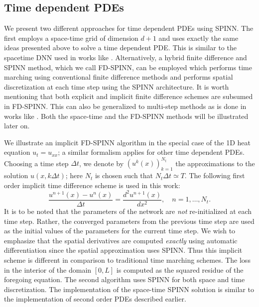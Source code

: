 \documentclass[12pt]{article}
\newcommand{\rr}[1]{#1}
\newcommand{\rb}[1]{#1}
\begin{document}
\subsection{Time dependent PDEs}
We present two different approaches for time dependent PDEs using SPINN. The first employs a space-time grid of dimension $d + 1$ and uses exactly the same ideas presented above to solve a time dependent PDE. \rr{This is similar to the spacetime DNN used in works like \cite{RPK2019}.} Alternatively, a hybrid finite difference and SPINN method, which we call FD-SPINN, can be employed which performs time marching using conventional finite difference methods and performs spatial discretization at each time step using the SPINN architecture. It is worth mentioning that both explicit and implicit finite difference schemes are subsumed in FD-SPINN. \rr{This can also be generalized to multi-step methods as is done in works like \cite{RPK18multistep}.} Both the space-time and the FD-SPINN methods will be illustrated later on.

We illustrate an implicit FD-SPINN algorithm in the special case of the 1D heat equation $u_t = u_{xx}$; a similar formalism applies for other time dependent PDEs. Choosing a time step $\Delta t$, we denote by $(u^k(x))_{k=1}^{N_t}$ the approximations to the solution $u(x, k\Delta t)$; here $N_t$ is chosen such that $N_t \Delta t \simeq T$. The following first order implicit time difference scheme is used in this work:
\begin{displaymath}
\frac{u^{n+1}(x) - u^n(x)}{\Delta t} = \frac{d^2 u^{n+1}(x)}{d x^2}, \quad n = 1, \ldots, N_t.
\end{displaymath}
\rb{It is to be noted that the parameters of the network are \emph{not} re-initialized at each time step. Rather, the converged parameters from the previous time step are used as the initial values of the parameters for the current time step.} We wish to emphasize that the spatial derivatives are computed \emph{exactly} using automatic differentiation since the spatial approximation uses SPINN. Thus this implicit scheme is different in comparison to traditional time marching schemes. The loss in the interior of the domain $[0,L]$ is computed as the squared residue of the foregoing equation. The second algorithm uses SPINN for both space and time discretization. The implementation of the space-time SPINN solution is similar to the implementation of second order PDEs described earlier.
\end{document}
